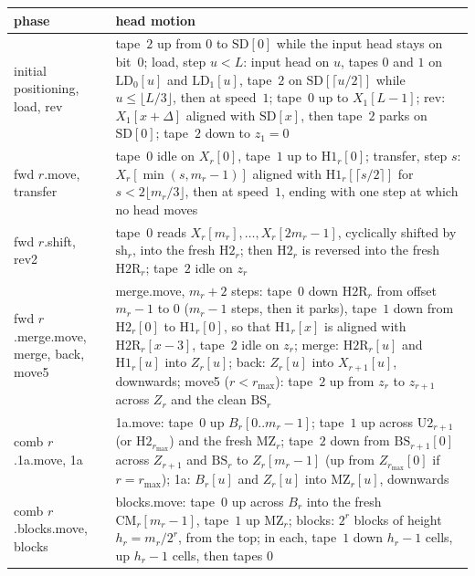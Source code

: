 \begin{center}\small
\begin{longtable}{>{\raggedright\arraybackslash}p{}>{\raggedright\arraybackslash}p{}}
\toprule
phase & head motion \\
\midrule
\endhead
initial positioning, load, rev & tape~$2$ up from $0$ to $\mathrm{SD}[0]$ while the input head stays on bit~$0$; load, step $u<L$:
input head on $u$, tapes $0$ and $1$ on $\mathrm{LD}_0[u]$ and $\mathrm{LD}_1[u]$, tape~$2$ on $\mathrm{SD}[\lceil u/2\rceil]$ while
$u\le\lfloor L/3\rfloor$, then at speed~$1$; tape~$0$ up to $X_1[L-1]$; rev: $X_1[x+\Delta]$ aligned with $\mathrm{SD}[x]$, then tape~$2$
parks on $\mathrm{SD}[0]$; tape~$2$ down to $z_1=0$ \\
fwd $r$.move, transfer & tape~$0$ idle on $X_r[0]$, tape~$1$ up to $\mathrm{H1}_r[0]$; transfer, step $s$: $X_r[\min(s,m_r-1)]$ aligned
with $\mathrm{H1}_r[\lceil s/2\rceil]$ for $s<2\lfloor m_r/3\rfloor$, then at speed~$1$, ending with one step at which no head moves \\
fwd $r$.shift, rev2 & tape~$0$ reads $X_r[m_r],\dots,X_r[2m_r-1]$, cyclically shifted by $\mathrm{sh}_r$, into the fresh $\mathrm{H2}_r$;
then $\mathrm{H2}_r$ is reversed into the fresh $\mathrm{H2R}_r$; tape~$2$ idle on $z_r$ \\
fwd $r$.merge.move, merge, back, move5 & merge.move, $m_r+2$ steps: tape~$0$ down $\mathrm{H2R}_r$ from offset $m_r-1$ to $0$ ($m_r-1$
steps, then it parks), tape~$1$ down from $\mathrm{H2}_r[0]$ to $\mathrm{H1}_r[0]$, so that $\mathrm{H1}_r[x]$ is aligned with
$\mathrm{H2R}_r[x-3]$, tape~$2$ idle on $z_r$; merge: $\mathrm{H2R}_r[u]$ and $\mathrm{H1}_r[u]$ into $Z_r[u]$; back: $Z_r[u]$ into
$X_{r+1}[u]$, downwards; move5 ($r<r_{\max}$): tape~$2$ up from $z_r$ to $z_{r+1}$ across $Z_r$ and the clean $\mathrm{BS}_r$ \\
comb $r$.1a.move, 1a & 1a.move: tape~$0$ up $B_r[0..m_r-1]$; tape~$1$ up across $\mathrm{U2}_{r+1}$ (or $\mathrm{H2}_{r_{\max}}$) and
the fresh $\mathrm{MZ}_r$; tape~$2$ down from $\mathrm{BS}_{r+1}[0]$ across $Z_{r+1}$ and $\mathrm{BS}_r$ to $Z_r[m_r-1]$ (up from
$Z_{r_{\max}}[0]$ if $r=r_{\max}$); 1a: $B_r[u]$ and $Z_r[u]$ into $\mathrm{MZ}_r[u]$, downwards \\
comb $r$.blocks.move, blocks & blocks.move: tape~$0$ up across $B_r$ into the fresh $\mathrm{CM}_r[m_r-1]$, tape~$1$ up $\mathrm{MZ}_r$;
blocks: $2^r$ blocks of height $h_r=m_r/2^r$, from the top; in each, tape~$1$ down $h_r-1$ cells, up $h_r-1$ cells, then tapes $0$

\end{longtable}
\end{center}
